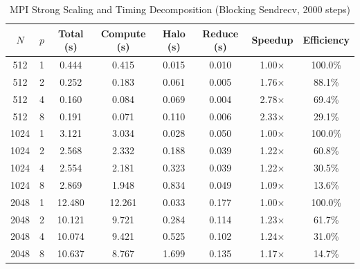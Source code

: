 \begin{table}[htbp]
\centering
\small
\caption{MPI Strong Scaling and Timing Decomposition (Blocking Sendrecv, 2000 steps)}
\label{tab:mpi}
\begin{tabular}{cccccccc}
\hline
\textbf{$N$} & \textbf{$p$} & \textbf{Total (s)} & \textbf{Compute (s)} & \textbf{Halo (s)} & \textbf{Reduce (s)} & \textbf{Speedup} & \textbf{Efficiency} \\
\hline
512 & 1 & 0.444 & 0.415 & 0.015 & 0.010 & 1.00$\times$ & 100.0\% \\
512 & 2 & 0.252 & 0.183 & 0.061 & 0.005 & 1.76$\times$ & 88.1\% \\
512 & 4 & 0.160 & 0.084 & 0.069 & 0.004 & 2.78$\times$ & 69.4\% \\
512 & 8 & 0.191 & 0.071 & 0.110 & 0.006 & 2.33$\times$ & 29.1\% \\
\hline
1024 & 1 & 3.121 & 3.034 & 0.028 & 0.050 & 1.00$\times$ & 100.0\% \\
1024 & 2 & 2.568 & 2.332 & 0.188 & 0.039 & 1.22$\times$ & 60.8\% \\
1024 & 4 & 2.554 & 2.181 & 0.323 & 0.039 & 1.22$\times$ & 30.5\% \\
1024 & 8 & 2.869 & 1.948 & 0.834 & 0.049 & 1.09$\times$ & 13.6\% \\
\hline
2048 & 1 & 12.480 & 12.261 & 0.033 & 0.177 & 1.00$\times$ & 100.0\% \\
2048 & 2 & 10.121 & 9.721 & 0.284 & 0.114 & 1.23$\times$ & 61.7\% \\
2048 & 4 & 10.074 & 9.421 & 0.525 & 0.102 & 1.24$\times$ & 31.0\% \\
2048 & 8 & 10.637 & 8.767 & 1.699 & 0.135 & 1.17$\times$ & 14.7\% \\
\hline
\end{tabular}
\end{table}
